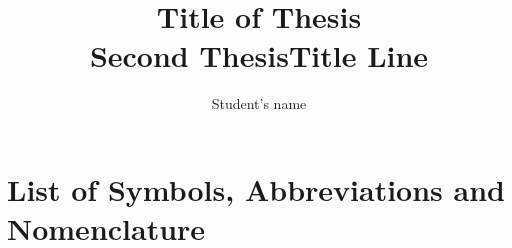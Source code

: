 \def\CTeXPreproc{Created by ctex v0.2.14, don't edit!}\documentclass{ctextemp_ucalgthes1}
\title{Title of Thesis \\ \bigskip Second ThesisTitle Line }
\author{Student's name}
\begin{document}


\makethesistitle
{}     %
\setcounter{page}{1}

\newpage
{}
{}

\newpage
{}
{}


\begin{singlespace}
\newpage
{}
\tableofcontents
\pagestyle{plain}
\newpage
{}
\listoftables
\pagestyle{plain}
\newpage
{}
\listoffigures
\pagestyle{plain}
\clearpage
\clearpage          %
\end{singlespace}
\newpage
{}
\chapter*{\bf{List of Symbols, Abbreviations and Nomenclature}\hfill} 
\listofsymbols
\pagestyle{plain}
\clearpage






%
%
\def\newblock{\hskip .11em plus .33em minus .07em} %

\end{document}
